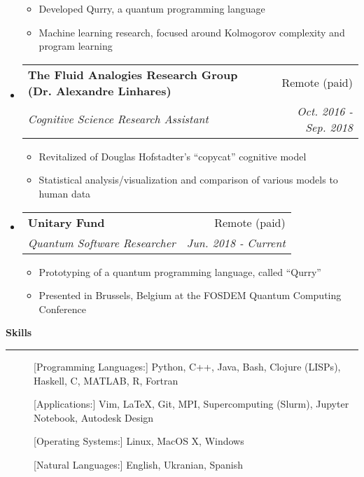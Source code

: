 \documentclass[letterpaper,11pt]{article}
\makeatletter
\newcommand{\sectionline}{
    \noindent\rule[0.5ex]{\linewidth}{0.5pt}
}
\newcommand{\resitem}[1]{\item[] #1 \vspace{-3pt}}
\newcommand{\resheading}[1]{
    {\large \textbf{#1}}
    \sectionline
}
\newcommand{\colfill}{@{\extracolsep{\fill}}}
\newcommand{\ressubheading}[4]{
\begin{tabular*}{6.5in}{l\colfill r}
		\textbf{#1} & #2 \\
		\textit{#3} & \textit{#4} \\
\end{tabular*}\vspace{-6pt}}
\makeatother
\begin{document}
\begin{itemize}
 	\begin{itemize}
        \resitem{Developed Qurry, a quantum programming language}
        \resitem{Machine learning research, focused around Kolmogorov complexity and program learning}
 	\end{itemize}
 \item[]
    \ressubheading{The Fluid Analogies Research Group (Dr. Alexandre Linhares)}{Remote (paid)}{Cognitive Science Research Assistant}{Oct. 2016 - Sep. 2018}
 	\begin{itemize}
 		\resitem{Revitalized of Douglas Hofstadter's ``copycat'' cognitive model}
 		\resitem{Statistical analysis/visualization and comparison of various models to human data}
 	\end{itemize}
 \item[]
     \ressubheading{Unitary Fund}{Remote (paid)}{Quantum Software Researcher}{Jun. 2018 - Current}
 	\begin{itemize}
            \resitem{Prototyping of a quantum programming language, called ``Qurry''}
            \resitem{Presented in Brussels, Belgium at the FOSDEM Quantum Computing Conference}
 	\end{itemize}
\end{itemize}

\resheading{Skills}
\begin{description}
    \item[][Programming Languages:] 
        Python, C++, Java, Bash, Clojure (LISPs), Haskell, C, MATLAB, R, Fortran
    \item[][Applications:]
        Vim, \LaTeX, Git, MPI, Supercomputing (Slurm), Jupyter Notebook, Autodesk Design 
    \item[][Operating Systems:]
        Linux, MacOS X, Windows
    \item[][Natural Languages:] 
        English, Ukranian, Spanish
\end{description}
\end{document}
